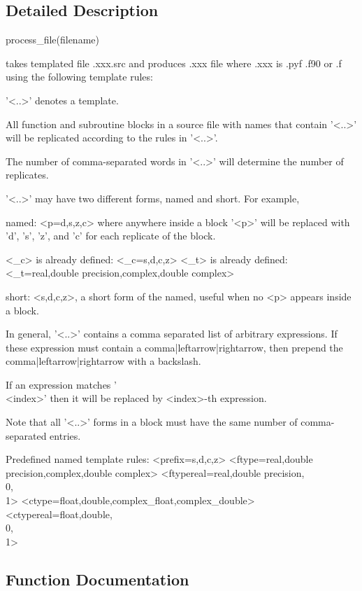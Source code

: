 \subsection{Detailed Description}
\begin{DoxyVerb}process_file(filename)

  takes templated file .xxx.src and produces .xxx file where .xxx
  is .pyf .f90 or .f using the following template rules:

  '<..>' denotes a template.

  All function and subroutine blocks in a source file with names that
  contain '<..>' will be replicated according to the rules in '<..>'.

  The number of comma-separated words in '<..>' will determine the number of
  replicates.

  '<..>' may have two different forms, named and short. For example,

  named:
   <p=d,s,z,c> where anywhere inside a block '<p>' will be replaced with
   'd', 's', 'z', and 'c' for each replicate of the block.

   <_c>  is already defined: <_c=s,d,c,z>
   <_t>  is already defined: <_t=real,double precision,complex,double complex>

  short:
   <s,d,c,z>, a short form of the named, useful when no <p> appears inside
   a block.

  In general, '<..>' contains a comma separated list of arbitrary
  expressions. If these expression must contain a comma|leftarrow|rightarrow,
  then prepend the comma|leftarrow|rightarrow with a backslash.

  If an expression matches '\\<index>' then it will be replaced
  by <index>-th expression.

  Note that all '<..>' forms in a block must have the same number of
  comma-separated entries.

 Predefined named template rules:
  <prefix=s,d,c,z>
  <ftype=real,double precision,complex,double complex>
  <ftypereal=real,double precision,\\0,\\1>
  <ctype=float,double,complex_float,complex_double>
  <ctypereal=float,double,\\0,\\1>\end{DoxyVerb}
 

\subsection{Function Documentation}
\mbox{\label{namespacenumpy_1_1distutils_1_1from__template_af368bcf90d70d5ee731188e634cce195}} 
